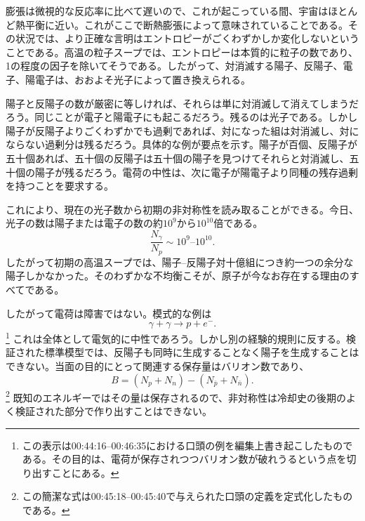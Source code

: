 膨張は微視的な反応率に比べて遅いので、これが起こっている間、宇宙はほとんど熱平衡に近い。これがここで断熱膨張によって意味されていることである。その状況では、より正確な言明はエントロピーがごくわずかしか変化しないということである。高温の粒子スープでは、エントロピーは本質的に粒子の数であり、1の程度の因子を除いてそうである。したがって、対消滅する陽子、反陽子、電子、陽電子は、おおよそ光子によって置き換えられる。

陽子と反陽子の数が厳密に等しければ、それらは単に対消滅して消えてしまうだろう。同じことが電子と陽電子にも起こるだろう。残るのは光子である。しかし陽子が反陽子よりごくわずかでも過剰であれば、対になった組は対消滅し、対にならない過剰分は残るだろう。具体的な例が要点を示す。陽子が百個、反陽子が五十個あれば、五十個の反陽子は五十個の陽子を見つけてそれらと対消滅し、五十個の陽子が残るだろう。電荷の中性は、次に電子が陽電子より同種の残存過剰を持つことを要求する。

これにより、現在の光子数から初期の非対称性を読み取ることができる。今日、光子の数は陽子または電子の数の約\(10^9\)から\(10^{10}\)倍である。
\[
\frac{N_\gamma}{N_p} \sim 10^9\text{--}10^{10}.
\]
したがって初期の高温スープでは、陽子--反陽子対十億組につき約一つの余分な陽子しかなかった。そのわずかな不均衡こそが、原子が今なお存在する理由のすべてである。

\begin{classroomqa}
\end{classroomqa}

したがって電荷は障害ではない。模式的な例は
\[
\gamma + \gamma \to p + e^-.
\]\footnote{この表示は00:44:16--00:46:35における口頭の例を編集上書き起こしたものである。その目的は、電荷が保存されつつバリオン数が破れうるという点を切り出すことにある。}
これは全体として電気的に中性であろう。しかし別の経験的規則に反する。検証された標準模型では、反陽子も同時に生成することなく陽子を生成することはできない。当面の目的にとって関連する保存量はバリオン数であり、
\[
B=(N_p+N_n)-(N_{\bar p}+N_{\bar n}).
\]\footnote{この簡潔な式は00:45:18--00:45:40で与えられた口頭の定義を定式化したものである。}
既知のエネルギーではその量は保存されるので、非対称性は冷却史の後期のよく検証された部分で作り出すことはできない。

